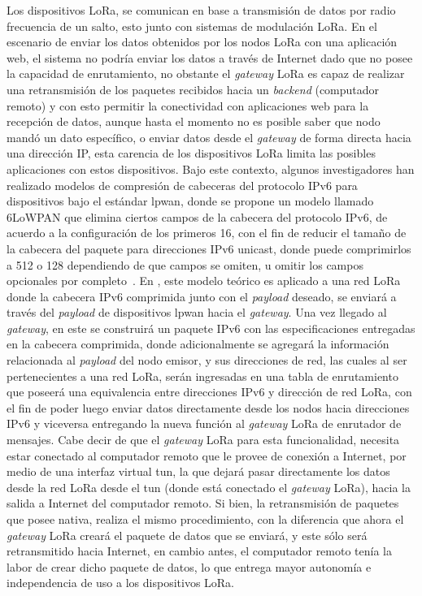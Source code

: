 \begin{justify}
Los dispositivos LoRa, se comunican en base a transmisión de datos por radio frecuencia de un salto, esto junto con sistemas de modulación LoRa. En el escenario de enviar los datos obtenidos por los nodos LoRa con una aplicación web, el sistema no podría enviar los datos a través de Internet dado que no posee la capacidad de enrutamiento, no obstante el \textit{gateway} LoRa es capaz de realizar una retransmisión de los paquetes recibidos hacia un \textit{backend} (computador remoto) y con esto permitir la conectividad con aplicaciones web para la recepción de datos, aunque hasta el momento no es posible saber que nodo mandó un dato específico, o enviar datos desde el \textit{gateway} de forma directa hacia una dirección IP, esta carencia de los dispositivos LoRa limita las posibles aplicaciones con estos dispositivos. Bajo este contexto, algunos investigadores  han realizado modelos de compresión de cabeceras del protocolo IPv6 para dispositivos bajo el estándar \gls{lpwan}, donde se propone un modelo llamado 6LoWPAN que elimina ciertos campos de la cabecera del protocolo IPv6, de acuerdo a la configuración de los primeros \SI{16}{\bit}, con el fin de reducir el tamaño de la cabecera del paquete para direcciones IPv6 unicast, donde puede comprimirlos a \SI{512}{\bit} o \SI{128}{\bit} dependiendo de que campos se omiten, u omitir los campos opcionales por completo~\cite{lowpan}. En \cite{tomas}, este modelo teórico es aplicado a una red LoRa donde la cabecera IPv6 comprimida junto con el \textit{payload} deseado, se enviará a través del \textit{payload} de dispositivos \gls{lpwan} hacia el \textit{gateway}. Una vez llegado al \textit{gateway}, en este se construirá un paquete IPv6 con las especificaciones entregadas en la cabecera comprimida, donde adicionalmente se agregará la información relacionada al \textit{payload} del nodo emisor, y sus direcciones de red, las cuales al ser pertenecientes a una red LoRa, serán ingresadas en una tabla de enrutamiento que poseerá una equivalencia entre direcciones IPv6 y dirección de red LoRa, con el fin de poder luego enviar datos directamente desde los nodos hacia direcciones IPv6 y viceversa entregando la nueva función al \textit{gateway} LoRa de enrutador de mensajes.\newpage
\noindent
Cabe decir de que el \textit{gateway} LoRa para esta funcionalidad, necesita estar conectado al computador remoto que le provee de conexión a Internet, por medio de una interfaz virtual \gls{tun}, la que dejará pasar directamente los datos desde la red LoRa desde el \gls{tun} (donde está conectado el \textit{gateway} LoRa), hacia la salida a Internet del computador remoto. Si bien, la retransmisión de paquetes que posee nativa, realiza el mismo procedimiento, con la diferencia que ahora el \textit{gateway} LoRa creará el paquete de datos que se enviará, y este sólo será retransmitido hacia Internet, en cambio antes, el computador remoto tenía la labor de crear dicho paquete de datos, lo que entrega mayor autonomía e independencia de uso a los dispositivos LoRa.\\

\end{justify}
